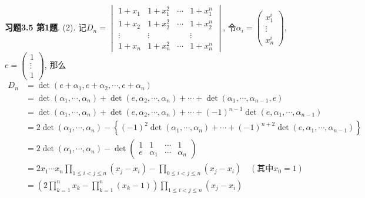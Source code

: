 {\bf 习题3.5 第1题}. (2). 记$D_n = \begin{vmatrix} 1+x_1 & 1+x_1^2 & \cdots & 1+x_1^n \\ 1+x_2 & 1+x_2^2 & \cdots & 1+x_2^n \\ \vdots & \vdots & & \vdots \\ 1+x_n & 1+x_n^2 & \cdots & 1+x_n^n \end{vmatrix}$, 令$\alpha_i = \begin{pmatrix} x_1^i \\ \vdots \\ x_n^i \end{pmatrix}$, $e = \begin{pmatrix} 1 \\ \vdots \\ 1 \end{pmatrix}$, 那么
\begin{align*}
D_n & = \det (e+\alpha_1, e+\alpha_2, \cdots, e+\alpha_n) \\
& = \det(\alpha_1, \cdots, \alpha_n) + \det(e, \alpha_2, \cdots, \alpha_n) + \cdots + \det(\alpha_1, \cdots, \alpha_{n-1}, e) \\
& = \det(\alpha_1, \cdots, \alpha_n) + \det(e, \alpha_2, \cdots, \alpha_n) + \cdots + (-1)^{n-1}\det(e, \alpha_1, \cdots, \alpha_{n-1}) \\
& = 2\det(\alpha_1, \cdots, \alpha_n) - \left\{(-1)^2\det(\alpha_1, \cdots, \alpha_n) + \cdots + (-1)^{n+2} \det(e, \alpha_1, \cdots, \alpha_{n-1})\right\} \\
& = 2\det(\alpha_1, \cdots, \alpha_n) - \det\begin{pmatrix} 1 & 1 & \cdots & 1 \\ e & \alpha_1 & \cdots & \alpha_n \end{pmatrix} \\
& = 2x_1\cdots x_n \prod_{1\leqslant i<j \leqslant n} (x_j-x_i) - \prod_{0\leqslant i<j \leqslant n} (x_j-x_i) \quad (\text{其中$x_0=1$}) \\
& = \left( 2\prod_{k=1}^n x_k - \prod_{k=1}^n(x_k-1) \right) \prod_{1\leqslant i<j \leqslant n} (x_j-x_i)
\end{align*}

\newpageorvspace

